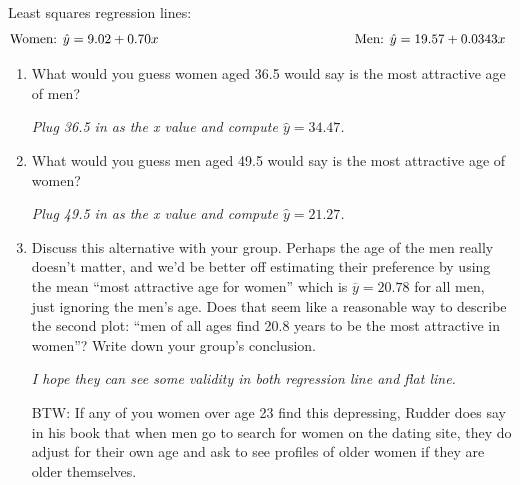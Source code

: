 Least squares regression lines:
$$ \mbox{Women: } \hat{y} = 9.02 + 0.70x \mbox{ \hspace{2in}}
   \mbox{Men: } \hat{y} = 19.57 + 0.0343x \mbox{ \vspace{-.7cm}} $$ 
\begin{enumerate}
  \item What would you guess  women aged 36.5 would say is the
    most attractive age of men? 
\begin{students}
 \vspace{1.5cm}      
\end{students}

\begin{key}
  {\it     Plug 36.5 in as the x value and compute $\hat{y} = 34.47$.}
\end{key}

  \item What would you guess  men aged 49.5 would say is the
    most attractive age of women? 
\begin{students}
 \vspace{1.5cm}      
\end{students}

\begin{key}
  {\it     Plug 49.5 in as the x value and compute $\hat{y} = 21.27$.}
\end{key}

\item Discuss this alternative with your group.  Perhaps the age of
  the men really doesn't matter, and we'd be better off estimating
  their preference by using the mean ``most attractive age for women''
  which is $\overline{y} = 20.78$ for all men, just ignoring the men's age.
   Does that seem like a reasonable way to describe the second plot:
   ``men of all ages find 20.8 years to be the most attractive in women''?
  Write down your group's conclusion.
  \begin{students}
 \vspace{2cm}      
\end{students}

\begin{key}
  {\it    I hope they can see some validity in both regression line
    and flat line.}
\end{key}

  BTW: If any of you women over age 23 find this depressing, Rudder
  does say in his book that when men go to search for women on the
  dating site, they do adjust for their own age and ask to see
  profiles of older women if they are older themselves.  %



\end{enumerate}
